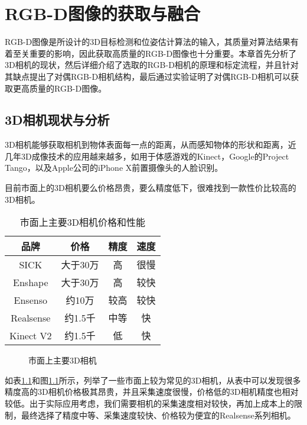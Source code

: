 \chapter{RGB-D图像的获取与融合}
\label{chap:rgbd}
RGB-D图像是所设计的3D目标检测和位姿估计算法的输入，其质量对算法结果有着至关重要的影响，因此获取高质量的RGB-D图像也十分重要。本章首先分析了3D相机的现状，然后详细介绍了选取的RGB-D相机的原理和标定流程，并且针对其缺点提出了对偶RGB-D相机结构，最后通过实验证明了对偶RGB-D相机可以获取更高质量的RGB-D图像。

\section{3D相机现状与分析}
3D相机能够获取相机到物体表面每一点的距离，从而感知物体的形状和距离，近几年3D成像技术的应用越来越多，如用于体感游戏的Kinect\cite{kinect}，Google的Project Tango\cite{tango}，以及Apple公司的iPhone X前置摄像头的人脸识别。

目前市面上的3D相机要么价格昂贵，要么精度低下，很难找到一款性价比较高的3D相机。
\begin{table}[ht]
  \centering
  \begin{tabular}{cccc}
    \toprule
    品牌&价格&精度&速度 \\
    \midrule
    SICK&大于30万&高&很慢 \\
    Enshape&大于30万&高&较快 \\
    Ensenso&约10万&较高&较快 \\
    Realsense&约1.5千&中等&快 \\
    Kinect V2&约1.5千&低&快\\
    \bottomrule
  \end{tabular}
  \caption{市面上主要3D相机价格和性能}
  \label{tab:3d_camera}
\end{table}
\begin{figure}[ht]
  \centering
  \caption{市面上主要3D相机}
  \label{fig:3d_camera}
\end{figure}
如表\ref{tab:3d_camera}和图\ref{fig:3d_camera}所示，列举了一些市面上较为常见的3D相机，从表中可以发现很多精度高的3D相机价格极其昂贵，并且采集速度很慢，价格低的3D相机精度也相对较低。出于实际应用考虑，我们需要相机的采集速度相对较快，再加上成本上的限制，最终选择了精度中等、采集速度较快、价格较为便宜的Realsense系列相机。



